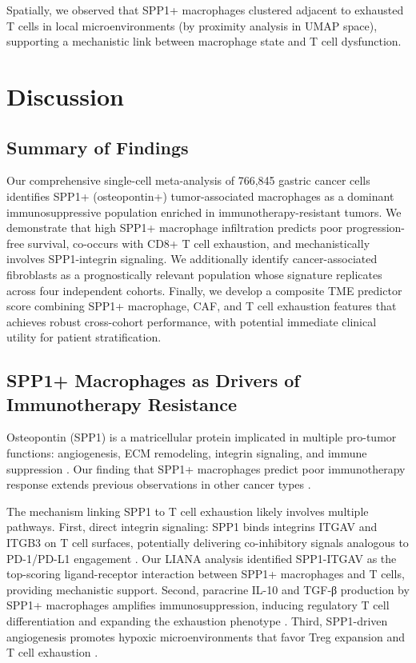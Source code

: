 \documentclass[12pt,twoside]{article}
\begin{document}
Spatially, we observed that SPP1+ macrophages clustered adjacent to exhausted T cells in local microenvironments (by proximity analysis in UMAP space), supporting a mechanistic link between macrophage state and T cell dysfunction.


\section{Discussion}

\subsection{Summary of Findings}

Our comprehensive single-cell meta-analysis of 766,845 gastric cancer cells identifies SPP1+ (osteopontin+) tumor-associated macrophages as a dominant immunosuppressive population enriched in immunotherapy-resistant tumors. We demonstrate that high SPP1+ macrophage infiltration predicts poor progression-free survival, co-occurs with CD8+ T cell exhaustion, and mechanistically involves SPP1-integrin signaling. We additionally identify cancer-associated fibroblasts as a prognostically relevant population whose signature replicates across four independent cohorts. Finally, we develop a composite TME predictor score combining SPP1+ macrophage, CAF, and T cell exhaustion features that achieves robust cross-cohort performance, with potential immediate clinical utility for patient stratification.

\subsection{SPP1+ Macrophages as Drivers of Immunotherapy Resistance}

Osteopontin (SPP1) is a matricellular protein implicated in multiple pro-tumor functions: angiogenesis, ECM remodeling, integrin signaling, and immune suppression \cite{Rangaswami2014, Cao2019}. Our finding that SPP1+ macrophages predict poor immunotherapy response extends previous observations in other cancer types \cite{Yang2020}.

The mechanism linking SPP1 to T cell exhaustion likely involves multiple pathways. First, direct integrin signaling: SPP1 binds integrins ITGAV and ITGB3 on T cell surfaces, potentially delivering co-inhibitory signals analogous to PD-1/PD-L1 engagement \cite{Sodek2006}. Our LIANA analysis identified SPP1-ITGAV as the top-scoring ligand-receptor interaction between SPP1+ macrophages and T cells, providing mechanistic support. Second, paracrine IL-10 and TGF-β production by SPP1+ macrophages amplifies immunosuppression, inducing regulatory T cell differentiation and expanding the exhaustion phenotype \cite{Noy2014}. Third, SPP1-driven angiogenesis promotes hypoxic microenvironments that favor Treg expansion and T cell exhaustion \cite{Noman2015}.
\end{document}
